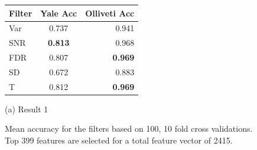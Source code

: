 \documentclass{article}
\begin{document}
\begin{figure}[htb]

\begin{minipage}[b]{1.0\linewidth}
  \centering
    \begin{tabular}{ | l || c | r |}
    \hline
    Filter & Yale Acc & Olliveti Acc \\ \hline
    Var & 0.737 & 0.941 \\ \hline 
    SNR & \textbf{0.813} & 0.968 \\ \hline
    FDR & 0.807 & \textbf{0.969} \\ \hline
    SD & 0.672 & 0.883 \\ \hline
    T & 0.812 & \textbf{0.969} \\
    \hline
    \end{tabular}
  \centerline{(a) Result 1}\medskip
\end{minipage}
%
\caption{Mean accuracy for the filters based on 100, 10 fold cross validations. Top 399 features are
selected for a total feature vector of 2415.}
\label{fig:res}
%
\end{figure}


\vfill
\pagebreak
\end{document}
